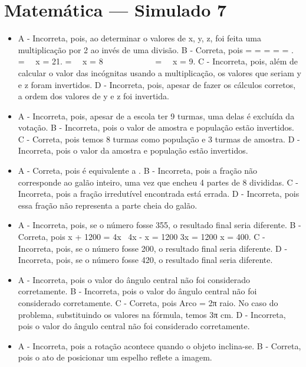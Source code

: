 \section*{Matemática — Simulado 7} 
\begin{itemize}
\item A - Incorreta, pois, ao determinar o valores de x, y, z, foi feita uma
multiplicação por 2 ao invés de uma divisão.
B - Correta, pois  =  =  =  =  = .  =  \rightarrow \ \ x = 21.  =  \rightarrow \ \ x = 8\ \ \ \ \ \ \ \ \ \ \ \  =  \rightarrow \ \ x = 9.
C - Incorreta, pois, além de calcular o valor das incógnitas usando a
multiplicação, os valores que seriam y e z foram invertidos.
D - Incorreta, pois, apesar de fazer os cálculos corretos, a ordem dos
valores de y e z foi invertida.
\item 
A - Incorreta, pois, apesar de a escola ter 9 turmas, uma delas é
excluída da votação.
B - Incorreta, pois o valor de amostra e população estão invertidos.
C - Correta, pois temos 8 turmas como população e 3 turmas de amostra.
D - Incorreta, pois o valor da amostra e população estão invertidos.
\item A - Correta, pois  é equivalente a .
B - Incorreta, pois a fração não corresponde ao galão inteiro, uma vez
que encheu 4 partes de 8 divididas.
C - Incorreta, pois a fração irredutível encontrada está errada.
D - Incorreta, pois essa fração não representa a parte cheia do galão.
\item A - Incorreta, pois, se o número fosse 355, o resultado final seria
diferente.
B - Correta, pois
x + 1200 = 4x \rightarrow \ 4x - x = 1200 \rightarrow 3x = 1200 \rightarrow x = 400.
C - Incorreta, pois, se o número fosse 200, o resultado final seria
diferente.
D - Incorreta, pois, se o número fosse 420, o resultado final seria
diferente.
\item A - Incorreta, pois o valor do ângulo central não foi considerado
corretamente.
B - Incorreta, pois o valor do ângulo central não foi considerado
corretamente.
C - Correta, pois Arco =  \times 2π \times raio.
No caso do problema, substituindo os valores na fórmula, temos 3π cm.
D - Incorreta, pois o valor do ângulo central não foi considerado
corretamente.
\item A - Incorreta, pois a rotação acontece quando o objeto inclina-se.
B - Correta, pois o ato de posicionar um espelho reflete a imagem.

\end{itemize}
